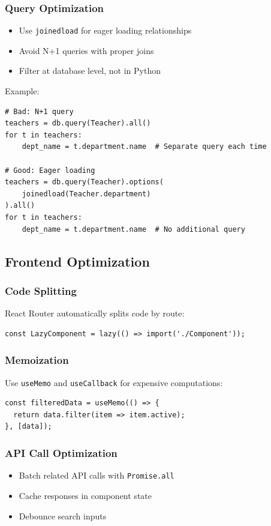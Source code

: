 \documentclass[12pt,a4paper]{article}
\begin{document}
\subsubsection{Query Optimization}
\begin{itemize}
    \item Use \texttt{joinedload} for eager loading relationships
    \item Avoid N+1 queries with proper joins
    \item Filter at database level, not in Python
\end{itemize}

Example:
\begin{verbatim}
# Bad: N+1 query
teachers = db.query(Teacher).all()
for t in teachers:
    dept_name = t.department.name  # Separate query each time

# Good: Eager loading
teachers = db.query(Teacher).options(
    joinedload(Teacher.department)
).all()
for t in teachers:
    dept_name = t.department.name  # No additional query
\end{verbatim}


\subsection{Frontend Optimization}

\subsubsection{Code Splitting}
React Router automatically splits code by route:
\begin{verbatim}
const LazyComponent = lazy(() => import('./Component'));
\end{verbatim}

\subsubsection{Memoization}
Use \texttt{useMemo} and \texttt{useCallback} for expensive computations:
\begin{verbatim}
const filteredData = useMemo(() => {
  return data.filter(item => item.active);
}, [data]);
\end{verbatim}

\subsubsection{API Call Optimization}
\begin{itemize}
    \item Batch related API calls with \texttt{Promise.all}
    \item Cache responses in component state
    \item Debounce search inputs
\end{itemize}
\end{document}
